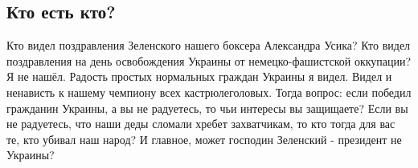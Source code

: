  
 
 

\subsection{Кто есть кто?}
\label{sec:02_11_2020.fb.alex_belyy.1.kto_est_kto}


Кто видел поздравления Зеленского нашего боксера Александра Усика? Кто видел
поздравления на день освобождения Украины от немецко-фашистской оккупации? Я не
нашёл. Радость простых нормальных граждан Украины я видел. Видел и ненависть к
нашему чемпиону всех кастрюлеголовых. Тогда вопрос: если победил гражданин
Украины, а вы не радуетесь, то чьи интересы вы защищаете? Если вы не радуетесь,
что наши деды сломали хребет захватчикам, то кто тогда для вас те, кто убивал
наш народ? И главное, может господин Зеленский - президент не Украины?

